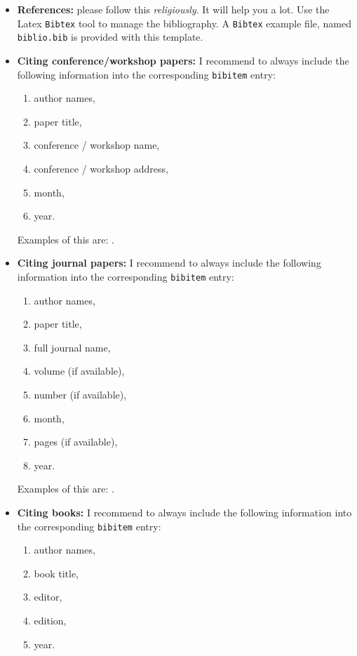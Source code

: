 \begin{itemize}
\item \textbf{References:} please follow this {\it religiously}. It will help you a lot. Use the Latex \texttt{Bibtex} tool to manage the bibliography. A \texttt{Bibtex} example file, named \texttt{biblio.bib} is provided with this template.\\

\item \textbf{Citing conference/workshop papers:} I recommend to always include the following information into the corresponding \texttt{bibitem} entry: 
\begin{enumerate}
\item author names, 
\item paper title, 
\item conference / workshop name, 
\item conference / workshop address, 
\item month, 
\item year.
\end{enumerate}
Examples of this are: \cite{Zargham-2011}\cite{Sadler-2006}.\\

\item \textbf{Citing journal papers:} I recommend to always include the following information into the corresponding \texttt{bibitem} entry: 
\begin{enumerate}
 \item author names, 
 \item paper title, 
 \item full journal name, 
 \item volume (if available), 
 \item number (if available), 
 \item month, 
 \item pages (if available), 
 \item year. 
 \end{enumerate}
 Examples of this are: \cite{Shannon-1948}\cite{Boyd-2011}\cite{Zordan-2014}.\\

\item \textbf{Citing books:} I recommend to always include the following information into the corresponding \texttt{bibitem} entry: 
\begin{enumerate}
\item author names, 
\item book title, 
\item editor, 
\item edition, 
\item year.\\
\end{enumerate}
\end{itemize}
